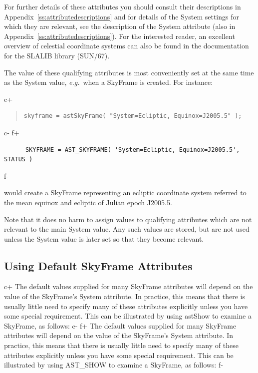 \documentclass[twoside,11pt]{article}
\newcommand{\xref}[3]{#1}
\newcommand{\appref}[1]{Appendix~\ref{#1}}
\newcommand{\appref}[1]{\ref{#1}}
\begin{document}
For further details of these attributes you should consult their
descriptions in \appref{ss:attributedescriptions} and for details of
the System settings for which they are relevant, see the description
of the System attribute (also in \appref{ss:attributedescriptions}).
For the interested reader, an excellent overview of celestial
coordinate systems can also be found in the documentation for the
SLALIB library (\xref{SUN/67}{sun67}{}).

The value of these qualifying attributes is most conveniently set at
the same time as the System value, {\em{e.g.}}\ when a SkyFrame is
created. For instance:

c+
\begin{quote}
\small
\begin{verbatim}
skyframe = astSkyFrame( "System=Ecliptic, Equinox=J2005.5" );
\end{verbatim}
\normalsize
\end{quote}
c-
f+
\small
\begin{verbatim}
      SKYFRAME = AST_SKYFRAME( 'System=Ecliptic, Equinox=J2005.5', STATUS )
\end{verbatim}
\normalsize
f-

would create a SkyFrame representing an ecliptic coordinate system
referred to the mean equinox and ecliptic of Julian epoch J2005.5.

Note that it does no harm to assign values to qualifying attributes
which are not relevant to the main System value. Any such values are
stored, but are not used unless the System value is later set so that
they become relevant.

\subsection{Using Default SkyFrame Attributes}

c+
The default values supplied for many SkyFrame attributes will depend
on the value of the SkyFrame's System attribute. In practice, this
means that there is usually little need to specify many of these
attributes explicitly unless you have some special requirement. This
can be illustrated by using astShow to examine a SkyFrame, as follows:
c-
f+
The default values supplied for many SkyFrame attributes will depend
on the value of the SkyFrame's System attribute. In practice, this
means that there is usually little need to specify many of these
attributes explicitly unless you have some special requirement. This
can be illustrated by using AST\_SHOW to examine a SkyFrame, as
follows:
f-
\end{document}
